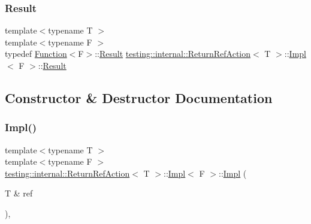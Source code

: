 \subsubsection{\texorpdfstring{Result}{Result}\hspace{0.1cm}{\footnotesize\ttfamily [3/3]}}
{\footnotesize\ttfamily template$<$typename T $>$ \\
template$<$typename F $>$ \\
typedef \mbox{\hyperlink{structtesting_1_1internal_1_1_function}{Function}}$<$F$>$\+::\mbox{\hyperlink{classtesting_1_1_action_interface_a7477de2fe3e4e01c59db698203acaee7}{Result}} \mbox{\hyperlink{classtesting_1_1internal_1_1_return_ref_action}{testing\+::internal\+::\+Return\+Ref\+Action}}$<$ T $>$\+::\mbox{\hyperlink{classtesting_1_1internal_1_1_return_ref_action_1_1_impl}{Impl}}$<$ F $>$\+::\mbox{\hyperlink{classtesting_1_1_action_interface_a7477de2fe3e4e01c59db698203acaee7}{Result}}}



\subsection{Constructor \& Destructor Documentation}
\mbox{\label{classtesting_1_1internal_1_1_return_ref_action_1_1_impl_a245d797a18ba609ce99bc5a383d6c36f}} 
\subsubsection{\texorpdfstring{Impl()}{Impl()}\hspace{0.1cm}{\footnotesize\ttfamily [1/3]}}
{\footnotesize\ttfamily template$<$typename T $>$ \\
template$<$typename F $>$ \\
\mbox{\hyperlink{classtesting_1_1internal_1_1_return_ref_action}{testing\+::internal\+::\+Return\+Ref\+Action}}$<$ T $>$\+::\mbox{\hyperlink{classtesting_1_1internal_1_1_return_ref_action_1_1_impl}{Impl}}$<$ F $>$\+::\mbox{\hyperlink{classtesting_1_1internal_1_1_return_ref_action_1_1_impl}{Impl}} (\begin{DoxyParamCaption}\item[{T \&}]{ref }\end{DoxyParamCaption})\hspace{0.3cm}{\ttfamily [inline]}, {\ttfamily [explicit]}}

